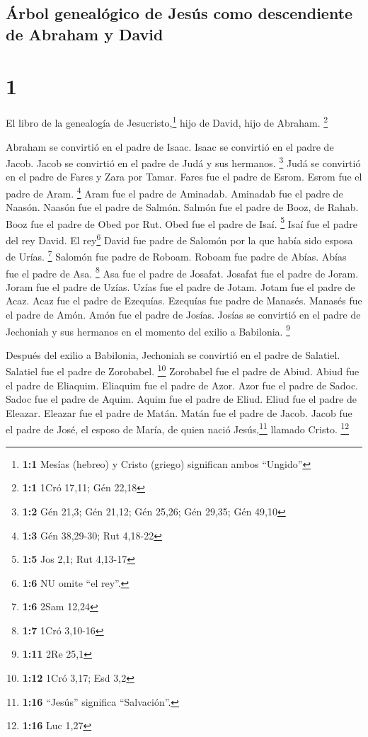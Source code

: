 \hypertarget{uxe1rbol-genealuxf3gico-de-jesuxfas-como-descendiente-de-abraham-y-david}{%
\subsection{Árbol genealógico de Jesús como descendiente de Abraham y
David}\label{uxe1rbol-genealuxf3gico-de-jesuxfas-como-descendiente-de-abraham-y-david}}

\hypertarget{section}{%
\section{1}\label{section}}

 El libro de la genealogía de Jesucristo,\footnote{\textbf{1:1}
  Mesías (hebreo) y Cristo (griego) significan ambos ``Ungido''} hijo de
David, hijo de Abraham. \footnote{\textbf{1:1} 1Cró 17,11; Gén 22,18}

 Abraham se convirtió en el padre de Isaac. Isaac se
convirtió en el padre de Jacob. Jacob se convirtió en el padre de Judá y
sus hermanos. \footnote{\textbf{1:2} Gén 21,3; Gén 21,12; Gén 25,26; Gén
  29,35; Gén 49,10}  Judá se convirtió en el padre de
Fares y Zara por Tamar. Fares fue el padre de Esrom. Esrom fue el padre
de Aram. \footnote{\textbf{1:3} Gén 38,29-30; Rut 4,18-22}
 Aram fue el padre de Aminadab. Aminadab fue el padre de
Naasón. Naasón fue el padre de Salmón.  Salmón fue el
padre de Booz, de Rahab. Booz fue el padre de Obed por Rut. Obed fue el
padre de Isaí. \footnote{\textbf{1:5} Jos 2,1; Rut 4,13-17}
 Isaí fue el padre del rey David. El rey\footnote{\textbf{1:6}
  NU omite ``el rey''.} David fue padre de Salomón por la que había sido
esposa de Urías. \footnote{\textbf{1:6} 2Sam 12,24} 
Salomón fue padre de Roboam. Roboam fue padre de Abías. Abías fue el
padre de Asa. \footnote{\textbf{1:7} 1Cró 3,10-16}  Asa
fue el padre de Josafat. Josafat fue el padre de Joram. Joram fue el
padre de Uzías.  Uzías fue el padre de Jotam. Jotam fue el
padre de Acaz. Acaz fue el padre de Ezequías.  Ezequías
fue padre de Manasés. Manasés fue el padre de Amón. Amón fue el padre de
Josías.  Josías se convirtió en el padre de Jechoniah y
sus hermanos en el momento del exilio a Babilonia. \footnote{\textbf{1:11}
  2Re 25,1}

 Después del exilio a Babilonia, Jechoniah se convirtió
en el padre de Salatiel. Salatiel fue el padre de Zorobabel. \footnote{\textbf{1:12}
  1Cró 3,17; Esd 3,2}  Zorobabel fue el padre de Abiud.
Abiud fue el padre de Eliaquim. Eliaquim fue el padre de Azor.
 Azor fue el padre de Sadoc. Sadoc fue el padre de Aquim.
Aquim fue el padre de Eliud.  Eliud fue el padre de
Eleazar. Eleazar fue el padre de Matán. Matán fue el padre de Jacob.
 Jacob fue el padre de José, el esposo de María, de quien
nació Jesús,\footnote{\textbf{1:16} ``Jesús'' significa ``Salvación''.}
llamado Cristo. \footnote{\textbf{1:16} Luc 1,27}

